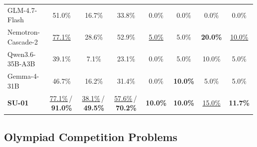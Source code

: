 \begin{table}[t]
{\begin{tabular}{lccccccc}
GLM-4.7-Flash & 51.0\% & 16.7\% & 33.8\% & 0.0\% & 0.0\% & 0.0\% & 0.0\% \\
Nemotron-Cascade-2 & \underline{77.1\%} & 28.6\% & 52.9\% & \underline{5.0\%} & 5.0\% & \textbf{20.0\%} & \underline{10.0\%} \\
Qwen3.6-35B-A3B & 39.1\% & 7.1\% & 23.1\% & 0.0\% & 5.0\% & 10.0\% & 5.0\% \\
Gemma-4-31B & 46.7\% & 16.2\% & 31.4\% & 0.0\% & \textbf{10.0\%} & 5.0\% & 5.0\% \\
\rowcolor{ScienceReasoningBg!35}
\textbf{\textcolor{iclrdeepblue}{SU-01}} & \underline{77.1\%}\,/\,\textbf{91.0\%} & \underline{38.1\%}\,/\,\textbf{49.5\%} & \underline{57.6\%}\,/\,\textbf{70.2\%} & \textbf{10.0\%} & \textbf{10.0\%} & \underline{15.0\%} & \textbf{11.7\%} \\
\bottomrule
\end{tabular}%
}
\end{table}

\subsection{Olympiad Competition Problems}



